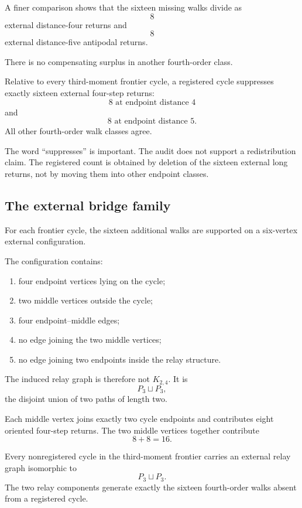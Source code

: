 A finer comparison shows that the sixteen missing walks divide as
\[
8
\]
external distance-four returns and
\[
8
\]
external distance-five antipodal returns.

There is no compensating surplus in another fourth-order class.

\begin{theorem}
Relative to every third-moment frontier cycle, a registered cycle
suppresses exactly sixteen external four-step returns:
\[
8
\text{ at endpoint distance }4
\]
and
\[
8
\text{ at endpoint distance }5.
\]
All other fourth-order walk classes agree.
\end{theorem}

The word ``suppresses'' is important. The audit does not support a
redistribution claim. The registered count is obtained by deletion of
the sixteen external long returns, not by moving them into other
endpoint classes.

\subsection{The external bridge family}

For each frontier cycle, the sixteen additional walks are supported on
a six-vertex external configuration.

The configuration contains:

\begin{enumerate}
    \item four endpoint vertices lying on the cycle;
    \item two middle vertices outside the cycle;
    \item four endpoint--middle edges;
    \item no edge joining the two middle vertices;
    \item no edge joining two endpoints inside the relay structure.
\end{enumerate}

The induced relay graph is therefore not \(K_{2,4}\). It is
\[
P_3\sqcup P_3,
\]
the disjoint union of two paths of length two.

Each middle vertex joins exactly two cycle endpoints and contributes
eight oriented four-step returns. The two middle vertices together
contribute
\[
8+8=16.
\]

\begin{theorem}
Every nonregistered cycle in the third-moment frontier carries an
external relay graph isomorphic to
\[
P_3\sqcup P_3.
\]
The two relay components generate exactly the sixteen fourth-order
walks absent from a registered cycle.
\end{theorem}

